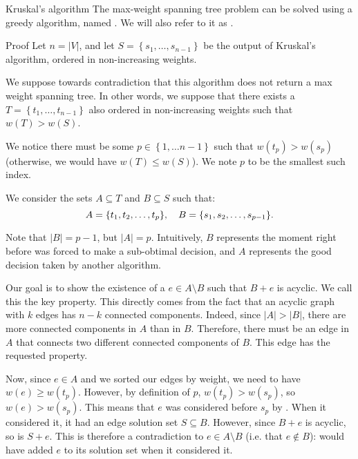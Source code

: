 \documentclass[a4paper]{article}
\begin{document}
\begin{parag}{Kruskal's algorithm}
    The max-weight spanning tree problem can be solved using a greedy algorithm, named . We will also refer to it as .


    \begin{subparag}{Proof}
        Let $n = \left|V\right|$, and let $S = \left\{s_1, \ldots, s_{n-1}\right\}$ be the output of Kruskal's algorithm, ordered in non-increasing weights.

        We suppose towards contradiction that this algorithm does not return a max weight spanning tree. In other words, we suppose that there exists a $T = \left\{t_1, \ldots, t_{n-1}\right\}$ also ordered in non-increasing weights such that $w\left(T\right) > w\left(S\right)$.

        We notice there must be some $p \in \left\{1, \ldots n-1\right\}$ such that $w\left(t_p\right) > w\left(s_p\right)$ (otherwise, we would have $w\left(T\right) \leq w\left(S\right)$). We note $p$ to be the smallest such index.

        We consider the sets $A \subseteq T$ and $B \subseteq S$ such that: 
        \[A = \left\{t_1, t_2, \ldots, t_p\right\}, \mathspace B = \left\{s_1, s_2, \ldots, s_{p-1}\right\}.\]

        Note that $\left|B\right| = p-1$, but $\left|A\right| = p$. Intuitively, $B$ represents the moment right before  was forced to make a sub-obtimal decision, and $A$ represents the good decision taken by another algorithm.

        Our goal is to show the existence of a $e \in A \setminus B$ such that $B + e$ is acyclic. We call this the key property. This directly comes from the fact that an acyclic graph with $k$ edges has $n-k$ connected components. Indeed, since $\left|A\right| > \left|B\right|$, there are more connected components in $A$ than in $B$. Therefore, there must be an edge in $A$ that connects two different connected components of $B$. This edge has the requested property.

        Now, since $e \in A$ and we sorted our edges by weight, we need to have $w\left(e\right) \geq w\left(t_p\right)$. However, by definition of $p$, $w\left(t_p\right) > w\left(s_p\right)$, so $w\left(e\right) > w\left(s_p\right)$. This means that $e$ was considered before $s_p$ by . When it considered it, it had an edge solution set $S \subseteq B$. However, since $B + e$ is acyclic, so is $S + e$. This is therefore a contradiction to $e \in A \setminus B$ (i.e. that $e \not \in B$):  would have added $e$ to its solution set when it considered it.


\end{subparag}
\end{parag}
\end{document}
